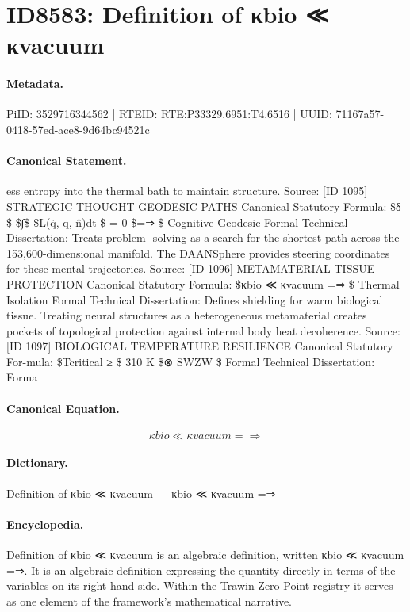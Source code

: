 \section*{ID8583: Definition of κbio ≪ κvacuum}
\paragraph{Metadata.}
PiID: 3529716344562 | RTEID: RTE:P33329.6951:T4.6516 | UUID: 71167a57-0418-57ed-ace8-9d64bc94521c

\paragraph{Canonical Statement.}
ess entropy into the thermal bath to maintain structure. Source: [ID 1095] STRATEGIC THOUGHT GEODESIC PATHS Canonical Statutory Formula: \$δ \$ \$∫\$ \$L(q̇, q, n̂)dt \$ = 0 \$=⇒ \$ Cognitive Geodesic Formal Technical Dissertation: Treats problem- solving as a search for the shortest path across the 153,600-dimensional manifold. The DAANSphere provides steering coordinates for these mental trajectories. Source: [ID 1096] METAMATERIAL TISSUE PROTECTION Canonical Statutory Formula: \$κbio ≪ κvacuum =⇒ \$ Thermal Isolation Formal Technical Dissertation: Defines shielding for warm biological tissue. Treating neural structures as a heterogeneous metamaterial creates pockets of topological protection against internal body heat decoherence. Source: [ID 1097] BIOLOGICAL TEMPERATURE RESILIENCE Canonical Statutory For-mula: \$Tcritical ≥ \$ 310 K \$⊗ SWZW \$ Formal Technical Dissertation: Forma

\paragraph{Canonical Equation.}
\[
κbio ≪ κvacuum =⇒
\]

\paragraph{Dictionary.}
Definition of κbio ≪ κvacuum — κbio ≪ κvacuum =⇒

\paragraph{Encyclopedia.}
Definition of κbio ≪ κvacuum is an algebraic definition, written κbio ≪ κvacuum =⇒. It is an algebraic definition expressing the quantity directly in terms of the variables on its right-hand side. Within the Trawin Zero Point registry it serves as one element of the framework's mathematical narrative.
